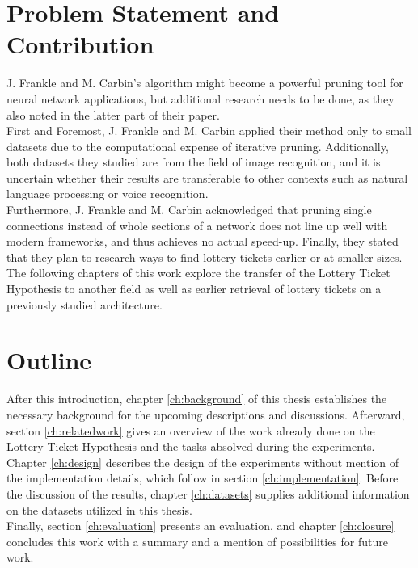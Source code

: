 \section{Problem Statement and Contribution}
J. Frankle and M. Carbin's algorithm might become a powerful pruning tool for neural network applications, but additional research needs to be done, as they also noted in the latter part of their paper.\\
First and Foremost, J. Frankle and M. Carbin applied their method only to small datasets due to the computational expense of iterative pruning.\cite{LTH} Additionally, both datasets they studied are from the field of image recognition, and it is uncertain whether their results are transferable to other contexts such as natural language processing or voice recognition.\\
Furthermore, J. Frankle and M. Carbin acknowledged that pruning single connections instead of whole sections of a network does not line up well with modern frameworks, and thus achieves no actual speed-up. Finally, they stated that they plan to research ways to find lottery tickets earlier or at smaller sizes.\cite{LTH}\\
The following chapters of this work explore the transfer of the Lottery Ticket Hypothesis to another field as well as earlier retrieval of lottery tickets on a previously studied architecture.


\section{Outline}

After this introduction, chapter \ref{ch:background} of this thesis establishes the necessary background for the upcoming descriptions and discussions. Afterward, section \ref{ch:relatedwork} gives an overview of the work already done on the Lottery Ticket Hypothesis and the tasks absolved during the experiments. Chapter \ref{ch:design} describes the design of the experiments without mention of the implementation details, which follow in section \ref{ch:implementation}. Before the discussion of the results, chapter \ref{ch:datasets} supplies additional information on the datasets utilized in this thesis.\\
Finally, section \ref{ch:evaluation} presents an evaluation, and chapter \ref{ch:closure} concludes this work with a summary and a mention of possibilities for future work.